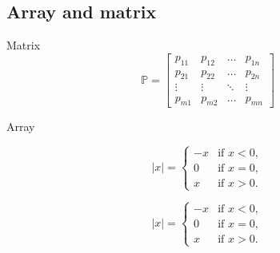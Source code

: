 \subsection{Array and matrix}
\begin{frame}

Matrix
\begin{equation*}
    \mathbb{P}= 
    \begin{bmatrix}
    p_{11} & p_{12} & \ldots& p_{1n} \\
    p_{21} & p_{22} & \ldots& p_{2n} \\
    \vdots & \vdots & \ddots& \vdots \\
    p_{m1} & p_{m2} & \ldots& p_{mn}
    \end{bmatrix}
\end{equation*}

Array

\begin{equation*}
|x| =
    \begin{cases}
    -x & \text{if } x < 0,\\
    0 & \text{if } x = 0,\\
    x & \text{if } x > 0.
    \end{cases}
\end{equation*}

\begin{equation*}
    |x| =\left\{
        \begin{array}{lr}
            -x & \text{if } x < 0,\\
            0 & \text{if } x = 0,\\
            x & \text{if } x > 0.
            \end{array}\right.
    \end{equation*}
\end{frame}